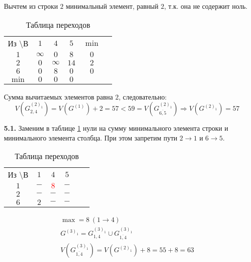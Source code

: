 Вычтем из строки $2$ минимальный элемент, равный $2$, т.к. она не содержит ноль.

\begin{table}[H]
\begin{center}
	\def\tabcolsep{15pt}
	\caption{Таблица переходов}
	\label{tab:12}
	\begin{tabular}{|c||c|c|c|c|c|}
		\hline
		Из \textbackslash В & $1$ & $4$ & $5$ & $\min$ \\
		\hhline{|=#=|=|=|=|}
		$1$ & $\infty$ & $0$ & $8$ & $0$ \\
		\hline
		$2$ & $0$ & $\infty$ & $14$ & $2$ \\
		\hline
		$6$ & $0$ & $8$ & $0$ & $0$ \\
		\hhline{|=#=|=|=|=|}
		$\min$ & $0$ & $0$ & $0$ & \\ 
		\hline
	\end{tabular}
\end{center}
\end{table}

Сумма вычитаемых элементов равна $2$, следовательно:
\begin{equation*}
V(G_{2,4}^{(2)_1}) = V(G^{(1)}) + 2 = 57 < 59 = V(G_{\overline{6,5}}^{(2)_1}) \Rightarrow V(G^{(2)_1}) = 57
\end{equation*}

\textbf{5.1.} Заменим в таблице \ref{tab:12} нули на сумму минимального элемента строки и минимального элемента столбца. При этом запретим пути $2 \rightarrow 1$ и $6 \rightarrow 5$.

\begin{table}[H]
\begin{center}
	\def\tabcolsep{15pt}
	\caption{Таблица переходов}
	\label{tab:13}
	\begin{tabular}{|c||c|c|c|c|c|}
		\hline
		Из \textbackslash В & $1$ & $4$ & $5$ \\
		\hhline{|=#=|=|=|=|}
		$1$ & $-$ & \textcolor{red}{\boldmath$8$} & $-$ \\
		\hline
		$2$ & $-$ & $-$ & $-$ \\
		\hline
		$6$ & $2$ & $-$ & $-$ \\
		\hline
	\end{tabular}
\end{center}
\end{table}

\begin{gather*}
\max = 8\ (1 \rightarrow 4) \\
G^{(3)_1} = G_{1,4}^{(3)_1} \cup G_{\overline{1,4}}^{(3)_1} \\
V(G_{\overline{1,4}}^{(3)_1}) = V(G^{(2)_1}) + 8 = 55 + 8 = 63
\end{gather*}

